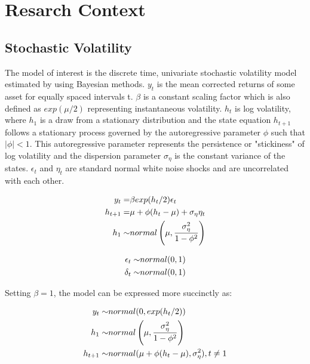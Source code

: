 \documentclass[12pt, a4paper]{article}
\begin{document}
\section{Resarch Context}

\subsection{Stochastic Volatility}
    The model of interest is the discrete time, univariate stochastic volatility model estimated by \citet{kim1998stochastic} using Bayesian methods. $y_t$ is the mean corrected returns of some asset for equally spaced intervals t. $\beta$ is a constant scaling factor which is also defined as $exp(\mu / 2)$ representing instantaneous volatility. $h_t$ is log volatility, where $h_1$ is a draw from a stationary distribution and the state equation $h_{t+1}$ follows a stationary process governed by the autoregressive parameter $\phi$ such that $|\phi|<1$. This autoregressive parameter represents the persistence or "stickiness" of log volatility and the dispersion parameter $\sigma_{\eta}$ is the constant variance of the states. $\epsilon_t$ and $\eta_t$ are standard normal white noise shocks and are uncorrelated with each other. 

    $$
    \begin{aligned}
    y_t =& \space \beta exp(h_t/2) \epsilon_t \\
    h_{t+1} =& \space \mu +\phi(h_t - \mu) + \sigma_{\eta} \eta_t  \\
    h_1 \sim& \space normal\left(\mu, \frac{\sigma_{\eta}^2}{1-\phi^2}\right) \\
    \end{aligned}
    $$


    $$
    \begin{aligned}
    \epsilon_t \sim& \space normal(0,1) \\
    \delta_t \sim& \space normal(0,1)
    \end{aligned}
    $$

    Setting $\beta=1$, the model can be expressed more succinctly as:

    $$
    \begin{aligned}
    y_t \sim& \space normal(0, exp(h_t/2)) \\ 
    h_1 \sim& \space normal \left(\mu, \frac{\sigma_{\eta}^2}{1-\phi^2}\right) \\
    h_{t+1} \sim& \space normal(\mu +\phi(h_t - \mu) , \sigma_{\eta}^2), \space\space t\neq 1\\ 
    \end{aligned}
    $$
\end{document}
